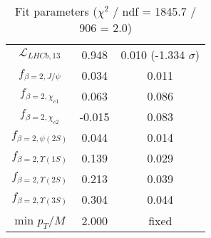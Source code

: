 \begin{table}[h!]
\begin{tabular}{c|c|c}
$\mathcal L_{LHCb,13}$ & 0.948 & 0.010 (-1.334 $\sigma$) \\
$f_{\beta=2,J/\psi}$ & 0.034 & 0.011 \\
$f_{\beta=2,\chi_{c1}}$ & 0.063 & 0.086 \\
$f_{\beta=2,\chi_{c2}}$ & -0.015 & 0.083 \\
$f_{\beta=2,\psi(2S)}$ & 0.044 & 0.014 \\
$f_{\beta=2,\Upsilon(1S)}$ & 0.139 & 0.029 \\
$f_{\beta=2,\Upsilon(2S)}$ & 0.213 & 0.039 \\
$f_{\beta=2,\Upsilon(3S)}$ & 0.304 & 0.044 \\
min $p_T/M$ & 2.000 & fixed \\
\end{tabular}
\caption{Fit parameters ($\chi^2$ / ndf = 1845.7 / 906 = 2.0)}
\end{table}

